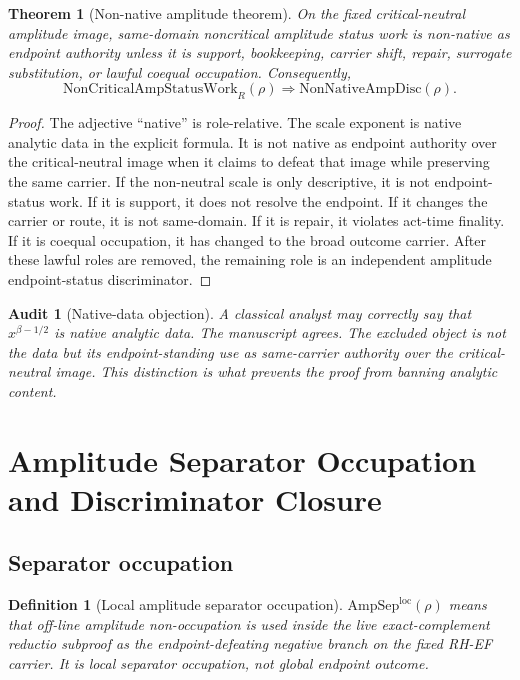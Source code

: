 \documentclass[11pt]{article}
\newtheorem{definition}{Definition}[section]
\newtheorem{theorem}{Theorem}[section]
\newtheorem{audit}{Audit}[section]
\newcommand{\AmpSepLoc}{\mathrm{AmpSep}^{\mathrm{loc}}}
\newcommand{\NonCritAmpWork}{\mathrm{NonCriticalAmpStatusWork}}
\newcommand{\NonNativeDisc}{\mathrm{NonNativeAmpDisc}}
\begin{document}
\begin{theorem}[Non-native amplitude theorem]
On the fixed critical-neutral amplitude image, same-domain noncritical amplitude status work is non-native as endpoint authority unless it is support, bookkeeping, carrier shift, repair, surrogate substitution, or lawful coequal occupation.  Consequently,
\[
\NonCritAmpWork_R(\rho)
\Rightarrow \NonNativeDisc(\rho).
\]
\end{theorem}

\begin{proof}
The adjective ``native'' is role-relative.  The scale exponent is native analytic data in the explicit formula.  It is not native as endpoint authority over the critical-neutral image when it claims to defeat that image while preserving the same carrier.  If the non-neutral scale is only descriptive, it is not endpoint-status work.  If it is support, it does not resolve the endpoint.  If it changes the carrier or route, it is not same-domain.  If it is repair, it violates act-time finality.  If it is coequal occupation, it has changed to the broad outcome carrier.  After these lawful roles are removed, the remaining role is an independent amplitude endpoint-status discriminator.
\end{proof}

\begin{audit}[Native-data objection]
A classical analyst may correctly say that \(x^{\beta-1/2}\) is native analytic data.  The manuscript agrees.  The excluded object is not the data but its endpoint-standing use as same-carrier authority over the critical-neutral image.  This distinction is what prevents the proof from banning analytic content.
\end{audit}

\section{Amplitude Separator Occupation and Discriminator Closure}

\subsection{Separator occupation}

\begin{definition}[Local amplitude separator occupation]
\(\AmpSepLoc(\rho)\) means that off-line amplitude non-occupation is used inside the live exact-complement reductio subproof as the endpoint-defeating negative branch on the fixed RH-EF carrier.  It is local separator occupation, not global endpoint outcome.
\end{definition}
\end{document}
